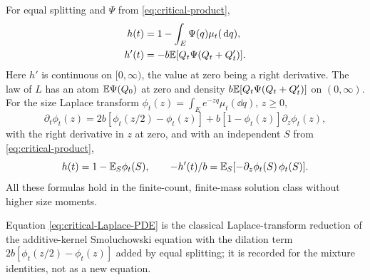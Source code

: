 \begin{theorem}
\label{thm:exact-last-density}
For equal splitting and $\Psi$ from \eqref{eq:critical-product},
\begin{align}
 h(t)&=1-\int_E\Psi(q)\mu_t(\,\mathrm d q),\label{eq:exact-last-observable}\\
 h'(t)&=-b\mathbb E[Q_t\Psi(Q_t+Q'_t)].\label{eq:exact-last-density}
\end{align}
Here $h'$ is continuous on $[0,\infty)$, the value at zero being a
right derivative. The law of $L$ has an atom $\mathbb E\Psi(Q_0)$ at zero and
density $b\mathbb E[Q_t\Psi(Q_t+Q'_t)]$ on $(0,\infty)$. For the size Laplace
transform $\phi_t(z)=\int_Ee^{-zq}\mu_t(\dd q)$, $z\geq0$,
\begin{equation}
 \partial_t\phi_t(z)
 =2b[\phi_t(z/2)-\phi_t(z)]
       +b[1-\phi_t(z)]\partial_z\phi_t(z),
 \label{eq:critical-Laplace-PDE}
\end{equation}
with the right derivative in $z$ at zero, and with an independent $S$
from \eqref{eq:critical-product},
\begin{equation}
 h(t)=1-\mathbb E_S\phi_t(S),\qquad
 -h'(t)/b=\mathbb E_S[-\partial_z\phi_t(S)\,\phi_t(S)].
 \label{eq:Laplace-mixture}
\end{equation}
All these formulas hold in the finite-count, finite-mass solution
class without higher size moments.
\end{theorem}

Equation \eqref{eq:critical-Laplace-PDE} is the classical
Laplace-transform reduction of the additive-kernel Smoluchowski
equation \citep{Golovin1963,Bertoin2002} with the dilation term
$2b[\phi_t(z/2)-\phi_t(z)]$ added by equal splitting; it is recorded
for the mixture identities, not as a new equation.

